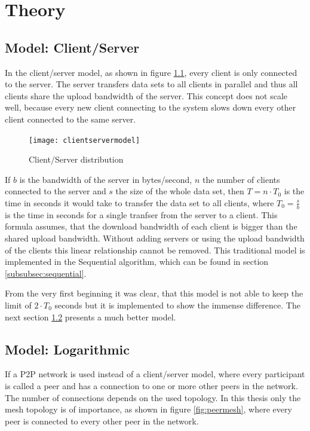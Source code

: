 \chapter{Theory}
\label{ch:theory}

\section{Model: Client/Server}
In the client/server model, as shown in figure \ref{fig:clientservermodel}, every client is only connected to the server. The server transfers data sets to all clients in parallel and thus all clients share the upload bandwidth of the server. This concept does not scale well, because every new client connecting to the system slows down every other client connected to the same server. 

\begin{figure}[H]
\centering
\texttt{[image: clientservermodel]}
\caption{Client/Server distribution}
\label{fig:clientservermodel}
\end{figure}

If $b$ is the bandwidth of the server in bytes/second, $n$ the number of clients connected to the server and $s$ the size of the whole data set, then $T= n \cdot T_0$ is the time in seconds it would take to transfer the data set to all clients, where $T_0=\frac{s}{b}$ is the time in seconds for a single tranfser from the server to a client. This formula assumes, that the download bandwidth of each client is bigger than the shared upload bandwidth. Without adding servers or using the upload bandwidth of the clients this linear relationship cannot be removed. This traditional model is implemented in the Sequential algorithm, which can be found in section \ref{subsubsec:sequential}.

From the very first beginning it was clear, that this model is not able to keep the limit of $2 \cdot T_0$ seconds but it is implemented to show the immense difference. The next section \ref{subsubsec:logarithmicmodel} presents a much better model.

\pagebreak
\section{Model: Logarithmic}
\label{subsubsec:logarithmicmodel}
If a P2P network is used instead of a client/server model, where every participant is called a peer and has a connection to one or more other peers in the network. The number of connections depends on the used topology. In this thesis only the mesh topology is of importance, as shown in figure \ref{fig:peermesh}, where every peer is connected to every other peer in the network.


